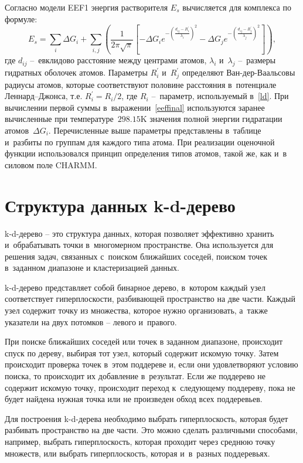 Согласно модели EEF1 энергия растворителя $E_{s}$ вычисляется для комплекса по формуле:
\begin{equation}
	E_{s}=\sum_{i} \Delta G_{i} + \sum_{i,j}\left( \frac{1}{2\pi\sqrt{\pi}} \left[-\Delta G_{i} e^{-\left(\frac{d_{ij}-R_{i}^{\prime}}{\lambda_{i}}\right)^{2}}-\Delta G_{j}e^{-\left(\frac{d_{ij}-R_{j}^{\prime}}{\lambda_{j}}\right)^{2}}\right]\right),
	\label{eeffinal}
\end{equation}
где $d_{ij}$ --~евклидово расстояние между центрами атомов, $\lambda_{i}$ и~$\lambda_{j}$ --~размеры гидратных оболочек атомов. Параметры $R_{i}^{\prime}$ и~$R_{j}^{\prime}$ определяют Ван-дер-Ваальсовы радиусы атомов, которые соответствуют половине расстояния в~потенциале Леннард--Джонса, т.е. $R_{i}^{\prime}=R_{i}/2$, где $R_{i}$ --~параметр, используемый в~\ref{ld}. При вычислении первой суммы в~выражении~\ref{eeffinal} используются заранее вычисленные при температуре~$298.15$K значения полной энергии гидратации атомов~$\Delta G_{i}$. Перечисленные выше параметры представлены в~таблице~\cite{eef1} и~разбиты по группам для каждого типа атома. При реализации оценочной функции использовался принцип определения типов атомов, такой же, как и~в силовом поле CHARMM. 

\section{Структура данных k-d-дерево}

k-d-дерево -- это структура данных, которая позволяет эффективно хранить и~обрабатывать точки в~многомерном пространстве. Она используется для решения задач, связанных с~поиском ближайших соседей, поиском точек в~заданном диапазоне и кластеризацией данных.

k-d-дерево представляет собой бинарное дерево, в~котором каждый узел соответствует гиперплоскости, разбивающей пространство на две части. Каждый узел содержит точку из множества, которое нужно организовать, а~также указатели на двух потомков -- левого и~правого.

При поиске ближайших соседей или точек в заданном диапазоне, происходит спуск по дереву, выбирая тот узел, который содержит искомую точку. Затем происходит проверка точек в~этом поддереве и, если они удовлетворяют условию поиска, то происходит их добавление в~результат. Если же поддерево не содержит искомую точку, происходит переход к~следующему поддереву, пока не будет найдена нужная точка или не произведен обход всех поддеревьев.

Для построения k-d-дерева необходимо выбрать гиперплоскость, которая будет разбивать пространство на две части. Это можно сделать различными способами, например, выбрать гиперплоскость, которая проходит через среднюю точку множеств, или выбрать гиперплоскость, которая и~в~разных поддеревьях.

